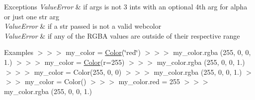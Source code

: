\begin{DoxyExceptions}{Exceptions}
{\em Value\+Error} & if args is not 3 ints with an optional 4th arg for alpha or just one str arg \\
\hline
{\em Value\+Error} & if a str passed is not a valid webcolor \\
\hline
{\em Value\+Error} & if any of the R\+G\+BA values are outside of their respective range \\
\hline
\end{DoxyExceptions}
\begin{DoxyParagraph}{Examples}
$>$$>$$>$ my\+\_\+color = \hyperlink{classbridges_1_1color_1_1_color}{Color}(\char`\"{}red\char`\"{}) $>$$>$$>$ my\+\_\+color.\+rgba (255, 0, 0, 1.) $>$$>$$>$ my\+\_\+color = \hyperlink{classbridges_1_1color_1_1_color}{Color}(r=255) $>$$>$$>$ my\+\_\+color.\+rgba (255, 0, 0, 1.) $>$$>$$>$ my\+\_\+color = Color(255, 0, 0) $>$$>$$>$ my\+\_\+color.\+rgba (255, 0, 0, 1.) $>$$>$$>$ my\+\_\+color = Color() $>$$>$$>$ my\+\_\+color.\+red = 255 $>$$>$$>$ my\+\_\+color.\+rgba (255, 0, 0, 1.) 
\end{DoxyParagraph}
